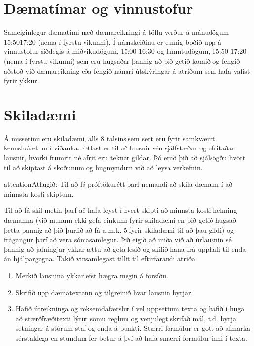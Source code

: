 \documentclass[a4paper,10pt,icelandic]{sphinxmanual}
\begin{document}
\section{Dæmatímar og vinnustofur}
\label{\detokenize{umnamskeidid:daematimar-og-vinnustofur}}
Sameiginlegur dæmatími með dæmareikningi á töflu verður á mánudögum
15:50\textendash{}17:20 (nema í fyrstu vikunni). Í námskeiðinu er einnig boðið upp á
vinnustofur síðdegis á miðvikudögum, 15:00-16:30 og fimmtudögum, 15:50-17:20 (nema í fyrstu
vikunni) sem eru hugsaðar þannig að þið getið komið og fengið aðstoð við
dæmareikning eða fengið nánari útskýringar á atriðum sem hafa vafist
fyrir ykkur.


\section{Skiladæmi}
\label{\detokenize{umnamskeidid:skiladaemi}}
Á misserinu eru skiladæmi, alls 8 talsins sem sett eru fyrir samkvæmt kennsluáætlun í viðauka. Ætlast er til að lausnir séu sjálfstæðar og
afritaðar lausnir, hvorki frumrit né afrit eru teknar gildar. Þó eruð
þið að sjálsögðu hvött til að skiptast á skoðunum og hugmyndum við að leysa verkefnin.

\begin{sphinxadmonition}{attention}{Athugið:}
Til að fá próftökurétt þarf nemandi að skila dæmum í að minnsta kosti  skiptum.
\end{sphinxadmonition}

Til að fá skil metin þarf að hafa leyst í hvert skipti að
minnsta kosti helming dæmanna (við munum ekki gefa einkunn fyrir
skiladæmi en þið getið hugsað þetta þannig að þið þurfið að fá a.m.k. 5
fyrir skiladæmi til að þau gildi) og frágangur þarf að vera
sómasamlegur. Þið eigið að miða við að úrlausnin sé þannig að jafningjar
ykkar ættu að geta lesið og skilið hana frá upphafi til enda án
hjálpargagna. Takið vinsamlegast tillit til eftirfarandi atriða
\begin{enumerate}
\def\theenumi{\arabic{enumi}}
\def\labelenumi{\theenumi .}
\makeatletter\def\p@enumii{\p@enumi \theenumi .}\makeatother
\item {} 
Merkið lausnina ykkar efst hægra megin á forsíðu.

\item {} 
Skrifið upp dæmatextann og tilgreinið hvar lausnin byrjar.

\item {} 
Hafið útreikninga og röksemdafærslur í vel uppsettum texta og hafið í
huga að stærðfræðitexti lýtur sömu reglum og venjulegt skrifað mál,
t.d. byrja setningar á stórum staf og enda á punkti. Stærri formúlur
er gott að afmarka sérstaklega en stundum fer betur á því að hafa
smærri formúlur inni í texta. 

\end{enumerate}
\end{document}
